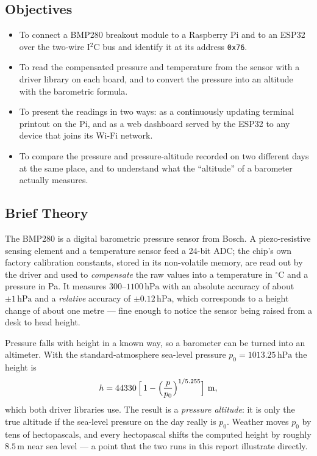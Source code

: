 \documentclass[10pt,a4paper]{article}
\begin{document}
\subsection*{Objectives}
\begin{itemize}
  \item To connect a BMP280 breakout module to a Raspberry Pi and to an ESP32 over the
        two-wire I$^2$C bus and identify it at its address \texttt{0x76}.
  \item To read the compensated pressure and temperature from the sensor with a
        driver library on each board, and to convert the pressure into an altitude
        with the barometric formula.
  \item To present the readings in two ways: as a continuously updating terminal
        printout on the Pi, and as a web dashboard served by the ESP32 to any device
        that joins its Wi-Fi network.
  \item To compare the pressure and pressure-altitude recorded on two different days
        at the same place, and to understand what the ``altitude'' of a barometer
        actually measures.
\end{itemize}

\subsection*{Brief Theory}
The BMP280 is a digital barometric pressure sensor from Bosch. A piezo-resistive
sensing element and a temperature sensor feed a 24-bit ADC; the chip's own factory
calibration constants, stored in its non-volatile memory, are read out by the driver
and used to \emph{compensate} the raw values into a temperature in $^{\circ}$C and a
pressure in Pa. It measures $300$--$1100\,\mathrm{hPa}$ with an absolute accuracy of
about $\pm1\,\mathrm{hPa}$ and a \emph{relative} accuracy of $\pm0.12\,\mathrm{hPa}$,
which corresponds to a height change of about one metre --- fine enough to notice the
sensor being raised from a desk to head height.

Pressure falls with height in a known way, so a barometer can be turned into an
altimeter. With the standard-atmosphere sea-level pressure $p_0 = 1013.25\,\mathrm{hPa}$
the height is
\[
  h = 44330\,\Bigl[\,1 - \Bigl(\frac{p}{p_0}\Bigr)^{1/5.255}\Bigr]\ \mathrm{m},
\]
which both driver libraries use. The result is a \emph{pressure altitude}: it is only
the true altitude if the sea-level pressure on the day really is $p_0$. Weather moves
$p_0$ by tens of hectopascals, and every hectopascal shifts the computed height by
roughly $8.5\,\mathrm{m}$ near sea level --- a point that the two runs in this report
illustrate directly.
\end{document}
